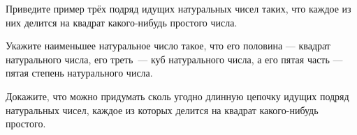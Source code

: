 ﻿
\begin{itemize}

\itA Приведите пример трёх подряд идущих натуральных чисел таких, что каждое из них делится на квадрат какого-нибудь простого числа.

\itB Укажите наименьшее натуральное число такое, что его половина — квадрат натурального числа, его треть~— куб натурального числа, а его пятая часть — пятая степень натурального числа.

\itC Докажите, что можно придумать сколь угодно длинную цепочку идущих подряд натуральных чисел, каждое из которых делится на квадрат какого-нибудь простого.
\end{itemize}